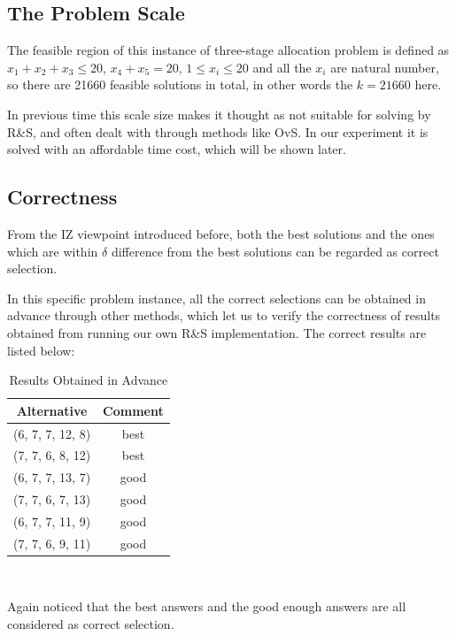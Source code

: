 \documentclass[12pt,a4paper]{report}
\begin{document}
\subsection{The Problem Scale}

The feasible region of this instance of three-stage allocation problem is defined as $x_1 + x_2 + x_3 \leqslant 20$, $x_4 + x_5 = 20$, $1 \leqslant x_i \leqslant 20$ and all the $x_i$ are natural number, so there are 21660 feasible solutions in total, in other words the $k = 21660$ here.

In previous time this scale size makes it thought as not suitable for solving by R\&S, and often dealt with through methods like OvS. In our experiment it is solved with an affordable time cost, which will be shown later.

\subsection{Correctness}

From the IZ viewpoint introduced before, both the best solutions and the ones which are within $\delta$ difference from the best solutions can be regarded as correct selection.

In this specific problem instance, all the correct selections can be obtained in advance through other methods, which let us to verify the correctness of results obtained from running our own R\&S implementation. The correct results are listed below:

\begin{table}[ht]
\begin{center}
\begin{tabular}{|c|c|}
\hline
Alternative & Comment \\
\hline
(6, 7, 7, 12, 8) & best \\
(7, 7, 6, 8, 12) & best \\
(6, 7, 7, 13, 7) & good \\
(7, 7, 6, 7, 13) & good \\
(6, 7, 7, 11, 9) & good \\
(7, 7, 6, 9, 11) & good \\
\hline
\end{tabular} \\
\caption{Results Obtained in Advance}
\end{center}
\end{table}

Again noticed that the best answers and the good enough answers are all considered as correct selection.
\end{document}
